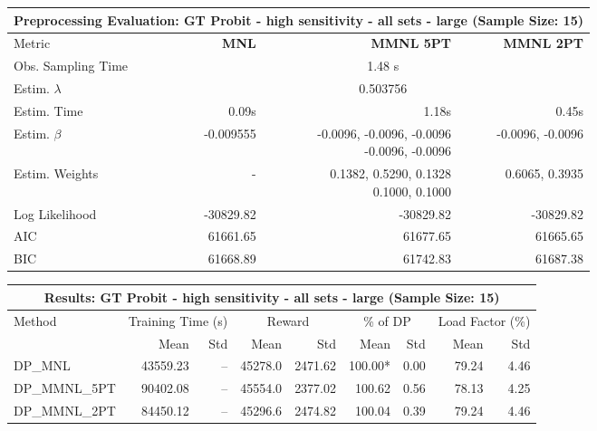 
\begin{samepage}
\begin{center}
  \small
  \begin{tabular}{l|r|r|r}
    \toprule
    \multicolumn{4}{c}{\textbf{Preprocessing Evaluation: GT Probit - high sensitivity - all sets - large (Sample Size: 15)}} \\
    \midrule
    Metric & \textbf{MNL} & \textbf{MMNL 5PT} & \textbf{MMNL 2PT} \\
    \midrule
    Obs. Sampling Time & \multicolumn{3}{c}{1.48 s} \\
    Estim. $\lambda$ & \multicolumn{3}{c}{0.503756} \\
    Estim. Time & 0.09s & 1.18s & 0.45s \\
    Estim. $\beta$ & -0.009555 & \makecell[tr]{-0.0096, -0.0096, -0.0096 \\ -0.0096, -0.0096} & -0.0096, -0.0096 \\
    Estim. Weights & - & \makecell[tr]{0.1382, 0.5290, 0.1328 \\ 0.1000, 0.1000} & 0.6065, 0.3935 \\
    Log Likelihood & -30829.82 & -30829.82 & -30829.82 \\
    AIC & 61661.65 & 61677.65 & 61665.65 \\
    BIC & 61668.89 & 61742.83 & 61687.38 \\
    \bottomrule
  \end{tabular}
\end{center}
\begin{center}
  \small
  \begin{tabular}{l|rr|rr|rr|rr}
    \toprule
    \multicolumn{9}{c}{\textbf{Results: GT Probit - high sensitivity - all sets - large (Sample Size: 15)}} \\
    \midrule
    Method & \multicolumn{2}{c|}{Training Time (s)} & \multicolumn{2}{c|}{Reward} & \multicolumn{2}{c|}{\% of DP} & \multicolumn{2}{c}{Load Factor (\%)} \\
    & Mean & Std & Mean & Std & Mean & Std & Mean & Std \\
    \midrule
    DP\_MNL      & 43559.23 &    -- &    45278.0 &    2471.62 & 100.00* &    0.00 &   79.24 &    4.46 \\
    DP\_MMNL\_5PT & 90402.08 &    -- &    45554.0 &    2377.02 &  100.62 &    0.56 &   78.13 &    4.25 \\
    DP\_MMNL\_2PT & 84450.12 &    -- &    45296.6 &    2474.82 &  100.04 &    0.39 &   79.24 &    4.46 \\

\end{tabular}
\end{center}
\end{samepage}
